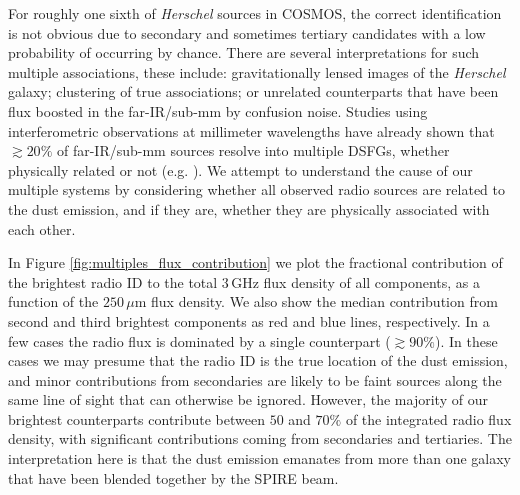 For roughly one sixth of \textit{Herschel} sources in COSMOS, the correct identification is not obvious due to secondary and sometimes tertiary candidates with a low probability of occurring by chance. There are several interpretations for such multiple associations, these include: gravitationally lensed images of the \textit{Herschel} galaxy; clustering of true associations; or unrelated counterparts that have been flux boosted in the far-IR/sub-mm by confusion noise. Studies using interferometric observations at millimeter wavelengths have already shown that $\gtrsim 20\%$ of far-IR/sub-mm sources resolve into multiple DSFGs, whether physically related or not (e.g. \citealt{Wang_2011, Karim_2013, Simpson_2015, Stach_2018}). We attempt to understand the cause of our multiple systems by considering whether all observed radio sources are related to the dust emission, and if they are, whether they are physically associated with each other.

In Figure \ref{fig:multiples_flux_contribution} we plot the fractional contribution of the brightest radio ID to the total $3\,$GHz flux density of all components, as a function of the $250\,\mu$m flux density. We also show the median contribution from second and third brightest components as red and blue lines, respectively. In a few cases the radio flux is dominated by a single counterpart ($\gtrsim 90\%$). In these cases we may presume that the radio ID is the true location of the dust emission, and minor contributions from secondaries are likely to be faint sources along the same line of sight that can otherwise be ignored. However, the majority of our brightest counterparts contribute between $50$ and $70\%$ of the integrated radio flux density, with significant contributions coming from secondaries and tertiaries. The interpretation here is that the dust emission emanates from more than one galaxy that have been blended together by the SPIRE beam.

